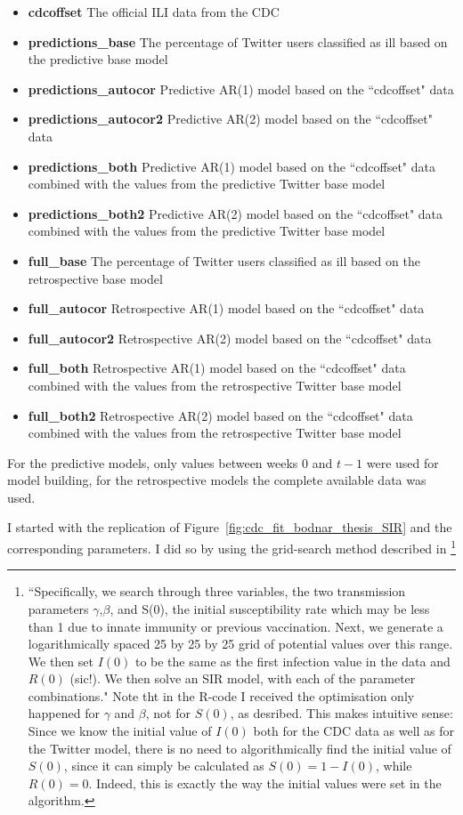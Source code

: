 \documentclass[11pt, a4paper]{report}\usepackage[]{graphicx}\usepackage[]{color}
\begin{document}
\begin{itemize}
  \item \textbf{cdcoffset} The official ILI data from the CDC
  \item \textbf{predictions\_base} The percentage of Twitter users classified as ill based on the predictive base model
  \item \textbf{predictions\_autocor} Predictive AR(1) model based on the ``cdcoffset" data
  \item \textbf{predictions\_autocor2} Predictive AR(2) model based on the ``cdcoffset" data
  \item \textbf{predictions\_both} Predictive AR(1) model based on the ``cdcoffset" data combined with the values from the predictive Twitter base model
  \item \textbf{predictions\_both2} Predictive AR(2) model based on the ``cdcoffset" data combined with the values from the predictive Twitter base model
 \item \textbf{full\_base} The percentage of Twitter users classified as ill based on the retrospective base model
  \item \textbf{full\_autocor} Retrospective AR(1) model based on the ``cdcoffset" data
  \item \textbf{full\_autocor2} Retrospective AR(2) model based on the ``cdcoffset" data
  \item \textbf{full\_both} Retrospective AR(1) model based on the ``cdcoffset" data combined with the values from the retrospective Twitter base model
  \item \textbf{full\_both2} Retrospective AR(2) model based on the ``cdcoffset" data combined with the values from the retrospective Twitter base model
\end{itemize}

For the predictive models, only values between weeks $0$ and $t-1$ were used for model building, for the retrospective models the complete available data was used.\newline

I started with the replication of Figure~\ref{fig:cdc_fit_bodnar_thesis_SIR} and the corresponding parameters. I did so by using the grid-search method described in \citep{bodnar_data_2015}\footnote{``Specifically, we
search through three variables, the two transmission parameters $\gamma$,$\beta$, and S(0), the initial susceptibility rate which may be less than 1 due to innate immunity or previous vaccination. Next, we generate a logarithmically spaced 25 by 25 by 25 grid of potential values over this range. We then set $I(0)$ to be the same as the first infection value in the data and $R(0)$ (sic!). We then solve an SIR model, with each of the parameter combinations." Note tht in the R-code I received the optimisation only happened for $\gamma$ and $\beta$, not for $S(0)$, as desribed. This makes intuitive sense: Since we know the initial value of $I(0)$ both for the CDC data as well as for the Twitter model, there is no need to algorithmically find the initial value of $S(0)$, since it can simply be calculated as $S(0)=1-I(0)$, while $R(0)=0$. Indeed, this is exactly the way the initial values were set in the algorithm.}\newline
\end{document}
